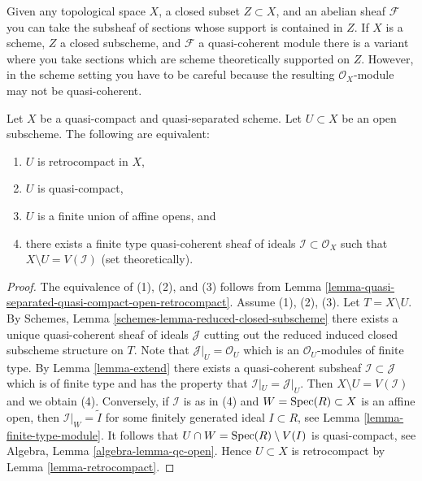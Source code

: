 \noindent
Given any topological space $X$, a closed subset $Z \subset X$, and an
abelian sheaf $\mathcal{F}$ you can take the subsheaf of sections whose
support is contained in $Z$. If $X$ is a scheme, $Z$ a closed
subscheme, and $\mathcal{F}$ a quasi-coherent module there is a variant
where you take sections which are scheme theoretically supported
on $Z$. However, in the scheme setting you have to be careful because
the resulting $\mathcal{O}_X$-module may not be quasi-coherent.

\begin{lemma}
\label{lemma-quasi-coherent-finite-type-ideals}
Let $X$ be a quasi-compact and quasi-separated scheme.
Let $U \subset X$ be an open subscheme. The following are equivalent:
\begin{enumerate}
\item $U$ is retrocompact in $X$,
\item $U$ is quasi-compact,
\item $U$ is a finite union of affine opens, and
\item there exists a finite type quasi-coherent sheaf of ideals
$\mathcal{I} \subset \mathcal{O}_X$ such that $X \setminus U = V(\mathcal{I})$
(set theoretically).
\end{enumerate}
\end{lemma}

\begin{proof}
The equivalence of (1), (2), and (3) follows from
Lemma \ref{lemma-quasi-separated-quasi-compact-open-retrocompact}.
Assume (1), (2), (3). Let $T = X \setminus U$. By
Schemes, Lemma \ref{schemes-lemma-reduced-closed-subscheme} there exists
a unique quasi-coherent sheaf of ideals $\mathcal{J}$ cutting
out the reduced induced closed subscheme structure on $T$.
Note that $\mathcal{J}|_U = \mathcal{O}_U$ which is an
$\mathcal{O}_U$-modules of finite type.
By Lemma \ref{lemma-extend} there exists a quasi-coherent subsheaf
$\mathcal{I} \subset \mathcal{J}$ which is of finite type
and has the property that $\mathcal{I}|_U = \mathcal{J}|_U$.
Then $X \setminus U = V(\mathcal{I})$ and we obtain (4). Conversely,
if $\mathcal{I}$ is as in (4) and $W = \mathop{\mathrm{Spec}}(R) \subset X$ is an affine
open, then $\mathcal{I}|_W = \widetilde{I}$ for some finitely generated
ideal $I \subset R$, see Lemma \ref{lemma-finite-type-module}.
It follows that $U \cap W = \mathop{\mathrm{Spec}}(R) \setminus V(I)$ is quasi-compact,
see Algebra, Lemma \ref{algebra-lemma-qc-open}. Hence $U \subset X$
is retrocompact by Lemma \ref{lemma-retrocompact}.
\end{proof}

